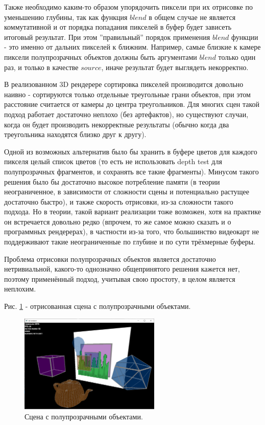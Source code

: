 \documentclass[14pt]{extarticle}
\begin{document}
Также необходимо каким-то образом упорядочить пиксели при их отрисовке по уменьшению глубины, так как функция $blend$ в общем случае не является коммутативной и от порядка попадания пикселей в буфер будет зависеть итоговый результат. При этом ''правильный'' порядок применения $blend$ функции - это именно от дальних пикселей к ближним. Например, самые близкие к камере пиксели полупрозрачных объектов должны быть аргументами $blend$ только один раз, и только в качестве $source$, иначе результат будет выглядеть некорректно.

В реализованном 3D рендерере сортировка пикселей производится довольно наивно - сортируются только отдельные треугольные грани объектов, при этом расстояние считается от камеры до центра треугольников. Для многих сцен такой подход работает достаточно неплохо (без артефактов), но существуют случаи, когда он будет производить некорректные результаты (обычно когда два треугольника находятся близко друг к другу).

Одной из возможных альтернатив было бы хранить в буфере цветов для каждого пикселя целый список цветов (то есть не использовать depth test для полупрозрачных фрагментов, и сохранять все такие фрагменты). Минусом такого решения было бы достаточно высокое потребление памяти (в теории неограниченное, в зависимости от сложности сцены и потенциально растущее достаточно быстро), и также скорость отрисовки, из-за сложности такого подхода. Но в теории, такой вариант реализации тоже возможен, хотя на практике он встречается довольно редко (впрочем, то же самое можно сказать и о программных рендерерах), в частности из-за того, что большинство видеокарт не поддерживают такие неограниченные по глубине и по сути трёхмерные буферы.

Проблема отрисовки полупрозрачных объектов является достаточно нетривиальной, какого-то однозначно общепринятого решения кажется нет, поэтому применённый подход, учитывая свою простоту, в целом является неплохим.

Рис. \ref{fig:transp} - отрисованная сцена с полупрозрачными объектами.

\begin{figure}
	\label{fig:transp}
	\caption{Сцена с полупрозрачными объектами.}
	\includegraphics[width=0.6\textwidth]{transparent.png}
\end{figure}
\end{document}
